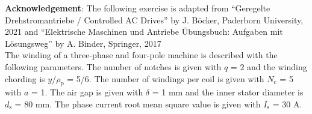 

\normalsize{\textbf{Acknowledgement}: The following exercise is adapted from ``Geregelte Drehstromantriebe / Controlled AC Drives'' by J. Böcker, Paderborn University, 2021 and
    ``Elektrische Maschinen und Antriebe Übungsbuch: Aufgaben mit Lösungsweg'' by A. Binder, Springer, 2017
}\\




The winding of a three-phase and four-pole machine is described with the following parameters. The number of notches is given with $q$ = 2 and the winding chording is $y/\rho_{\mathrm{p}}$ = 5/6. The number of windings per coil is given with $N_{\mathrm{c}}$ = 5 with $a$ = 1. The air gap is given with $\delta$ = 1 mm and the inner stator diameter is $d_{\mathrm{s}}$ = 80 mm. The phase current root mean square value is given with $I_{\mathrm{s}}$ = 30  A.


